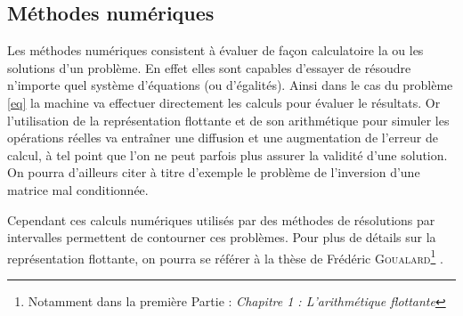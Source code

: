 \subsection{Méthodes numériques}
Les méthodes numériques consistent à évaluer de façon calculatoire la ou les solutions d'un problème. En effet elles sont capables d'essayer de résoudre n'importe quel système d'équations (ou d'égalités). Ainsi dans le cas du problème \ref{eq} la machine va effectuer directement les calculs pour évaluer le résultats. Or l'utilisation de la représentation flottante et de son arithmétique pour simuler les opérations réelles va entraîner une diffusion et une augmentation de l'erreur de calcul, à tel point que l'on ne peut  parfois plus assurer la validité d'une solution. On pourra d'ailleurs citer à titre d'exemple le problème de l'inversion d'une matrice mal conditionnée\cite{Conditionnement}. 

Cependant ces calculs numériques utilisés  par des méthodes de résolutions par intervalles permettent de contourner ces problèmes. Pour plus de détails sur la représentation flottante, on pourra se référer à la thèse de Frédéric \textsc{Goualard}\footnote{Notamment dans la première Partie : \emph{Chapitre 1 : L’arithmétique flottante}} \cite{Goualard}.

